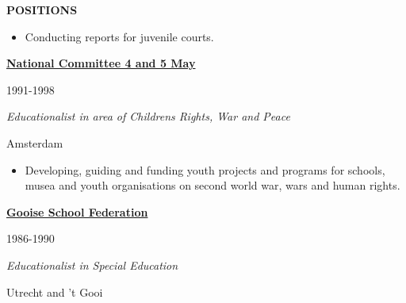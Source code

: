 \documentclass[
  16,
]{article}
\providecommand{\tightlist}{%
  \setlength{\itemsep}{0pt}\setlength{\parskip}{0pt}}\usepackage{longtable,booktabs,array}
\begin{document}
\begin{large}{\bf POSITIONS}
\begin{itemize}
\tightlist
\item
  Conducting reports for juvenile courts.
\end{itemize}

\vspace{7pt}

\begin{large}
  \begin{multicols}{2}
    \begin{flushleft}{\bf \href{https://www.4en5mei.nl/}{National Committee 4 and 5 May}}\end{flushleft}
    \begin{flushright}1991-1998\end{flushright}
  \end{multicols}
  \vspace{-0.17cm}
  \begin{multicols}{2}
    \begin{flushleft}\textit{Educationalist in area of Childrens Rights, War and Peace}\end{flushleft}
    \begin{flushright}Amsterdam\end{flushright}\end
  {multicols}
\end{large}
\vspace{-0.16cm}

\begin{itemize}
\tightlist
\item
  Developing, guiding and funding youth projects and programs for
  schools, musea and youth organisations on second world war, wars and
  human rights.
\end{itemize}

\vspace{7pt}

\begin{large}
  \begin{multicols}{2}
    \begin{flushleft}{\bf \href{https://gsf.nl/}{Gooise School Federation}}\end{flushleft}
    \begin{flushright}1986-1990\end{flushright}
  \end{multicols}
  \vspace{-0.17cm}
  \begin{multicols}{2}
    \begin{flushleft}\textit{Educationalist in Special Education}\end{flushleft}
    \begin{flushright}Utrecht and 't Gooi\end{flushright}\end
  {multicols}
\end{large}
\vspace{-0.16cm}


\end{large}
\end{document}
